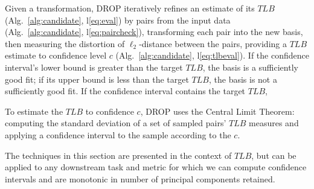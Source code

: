 Given a transformation, DROP iteratively refines an estimate of its $TLB$ (Alg.~\ref{alg:candidate}, l\ref{eq:eval}) by  pairs from the input data (Alg.~\ref{alg:candidate}, l\ref{eq:paircheck}), transforming each pair into the new basis, then measuring the distortion of $\ell_2$-distance between the pairs, providing a $TLB$ estimate to confidence level $c$ (Alg.~\ref{alg:candidate}, l\ref{eq:tlbeval}). 
If the confidence interval's lower bound is greater than the target $TLB$, the basis is a sufficiently good fit; if its upper bound is less than the target $TLB$, the basis is not a sufficiently good fit. 
If the confidence interval contains the target $TLB$,  

To estimate the $TLB$ to confidence $c$, DROP uses the Central Limit Theorem: computing the standard deviation of a set of sampled pairs' $TLB$ measures and applying a confidence interval to the sample according to the $c$.

The techniques in this section are presented in the context of $TLB$, but can be applied to any downstream task and metric for which we can compute confidence intervals and are monotonic in number of principal components retained.

